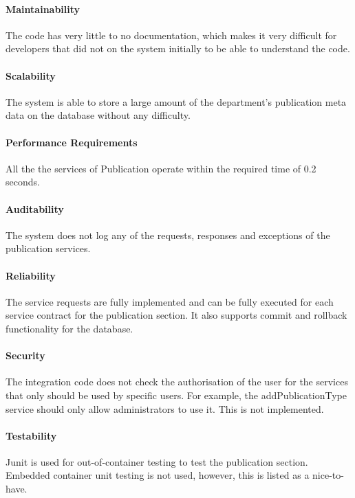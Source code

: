 \documentclass{article}
\begin{document}
            \paragraph{Maintainability}
            The code has very little to no documentation, which makes it very difficult for developers that did not on the system initially to be able to understand the code.
            
            \paragraph{Scalability}
            The system is able to store a large amount of the department's publication meta data on the database without any difficulty.
            
            \paragraph{Performance Requirements}
            All the the services of Publication operate within the required time of 0.2 seconds.
            
            \paragraph{Auditability}
            The system does not log any of the requests, responses and exceptions of the publication services.
            
            \paragraph{Reliability}
            The service requests are fully implemented and can be fully executed for each service contract for the publication section. It also supports commit and rollback functionality for the database.
            
            \paragraph{Security}
            The integration code does not check the authorisation of the user for the services that only should be used by specific users. For example, the addPublicationType service should only allow administrators to use it. This is not implemented.
            
            \paragraph{Testability}
            Junit is used for out-of-container testing to test the publication section. Embedded container unit testing is not used, however, this is listed as a nice-to-have.
		
\end{document}

